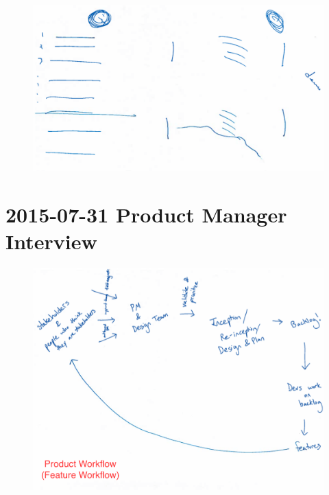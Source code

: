 \begin{figure}[h]
\centering
\includegraphics[width=6.5in]{interviews/drawings/2015_06_29b.png}
\caption{}
\end{figure}

\section{2015-07-31 Product Manager Interview}

\begin{figure}[h]
\centering
\includegraphics[width=6.5in]{interviews/drawings/2015_07_31a.png}
\caption{}
\end{figure}

